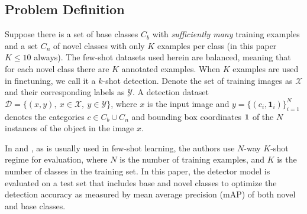 \documentclass{article}
\begin{document}
\subsection{Problem Definition}
Suppose there is  a set of base classes $C_b$ with \textit{sufficiently many} training examples and a set $C_n$ 
of novel classes with only $K$ examples per class (in this paper $K \leq 10$ always). 
The few-shot datasets used herein are balanced, meaning that for each novel class there are $K$ annotated examples.
When $K$ examples are used in finetuning, we call it a $k$-shot detection. 
Denote the set of training images as $\mathcal{X}$ and their corresponding labels as $\mathcal{Y}$. 
A detection dataset $\mathcal{D} = \{ (x,y), ~ x \in \mathcal{X}, ~ y \in \mathcal{Y} \}$, where $x$ 
is the input image and $y= \{(c_i, \bm 1_i) \}_{i=1}^N$ denotes the categories $c \in  C_b \cup C_n$ and 
bounding box coordinates $\boldsymbol{1} $ of the $N$ instances of the object in the image $x$. 

In \cite{VinyalsBLKW16} and \cite{snell2017prototypical}, as is usually used in few-shot learning, 
the authors use $N$-way $K$-shot regime for evaluation, where $N$ is the number of training examples, 
and $K$ is the number of classes in the training set. 
In this paper, the detector model is evaluated on a test set that includes base and novel classes
to optimize the detection accuracy as measured by mean average precision (mAP) of both novel and base classes.
\end{document}
